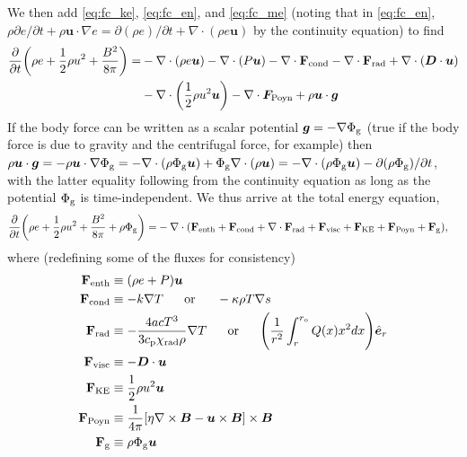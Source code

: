 \documentclass[12pt]{article} %
\newcommand{\pderiv}[2]{\frac{\partial#1}{\partial#2}}
\newcommand{\five}{\ \ \ \ \ }
\newcommand{\e}{\hat{\bm{e}}}
\newcommand{\curl}{\nabla\times}
\newcommand{\Div}{\nabla\cdot}
\newcommand{\phig}{\Phi_{\rm{g}}}
\newcommand{\ro}{r_{\rm{o}}}
\begin{document}
	We then add \eqref{eq:fc_ke}, \eqref{eq:fc_en}, and \eqref{eq:fc_me} (noting that in \eqref{eq:fc_en}, $\rho\partial e/\partial t + \rho\bm{u}\cdot\nabla e = \partial(\rho e)/\partial t + \Div(\rho e\bm{u})$ by the continuity equation) to find
	\begin{align*}
	\pderiv{}{t}\bigg{(}\rho e + \frac{1}{2}\rho u^2 + \frac{B^2}{8\pi}\bigg{)} = &-\Div(\rho e\bm{u}) - \Div(P\bm{u})  - \nabla\cdot\mathbf{F}_{\rm{cond}} -\nabla\cdot\mathbf{F}_{\rm{rad}}  + \Div(\bm{D}\cdot\bm{u}) \\
	&- \Div\bigg{(}\frac{1}{2}\rho u^2\bm{u}\bigg{)} -\Div\bm{F}_{\rm{Poyn}} + \rho\bm{u}\cdot\bm{g}
	\end{align*}
	If the body force can be written as a scalar potential $\bm{g}=-\nabla\phig$ (true if the body force is due to gravity and the centrifugal force, for example) then $\rho\bm{u}\cdot\bm{g} = -\rho\bm{u}\cdot\nabla \phig = -\Div(\rho\phig\bm{u}) + \phig\Div(\rho\bm{u}) = -\Div(\rho\phig\bm{u}) - \partial(\rho\phig)/\partial t$, with the latter equality following from the continuity equation as long as the potential $\phig$ is time-independent. We thus arrive at the total energy equation, 
	\begin{align}
	\pderiv{}{t}\bigg{(}\rho e + \frac{1}{2}\rho u^2 + \frac{B^2}{8\pi} + \rho\phig\bigg{)} = &-\Div(\mathbf{F}_{\rm{enth}} + \mathbf{F}_{\rm{cond}} + \nabla\cdot\mathbf{F}_{\rm{rad}}  + \mathbf{F}_{\rm{visc}} +  \mathbf{F}_{\rm{KE}} + \mathbf{F}_{\rm{Poyn}} + \mathbf{F}_{\rm{g}}),
	\end{align}
	where (redefining some of the fluxes for consistency)
	\begin{align}
	\mathbf{F}_{\rm{enth}} &\equiv (\rho e + P)\bm{u}\\	
	\mathbf{F}_{\rm{cond}} &\equiv -k\nabla T\five\text{or}\five -\kappa\rho T \nabla s\\
	\mathbf{F}_{\rm{rad}} &\equiv - \frac{4acT^3}{3c_{\rm{p}}\chi_{\rm{rad}}\rho}\nabla T\five\text{or}\five\Bigg{(}\frac{1}{r^2}\int_r^{{\ro}}Q(x)x^2dx\Bigg{)}\e_r\\
	\mathbf{F}_{\rm{visc}}  &\equiv -\bm{D}\cdot\bm{u}\\
	\mathbf{F}_{\rm{KE}} &\equiv \frac{1}{2}\rho u^2\bm{u}\\
	\mathbf{F}_{\rm{Poyn}} &\equiv \frac{1}{4\pi}[\eta\curl\bm{B} - \bm{u}\times\bm{B}]\times\bm{B}\\
	\mathbf{F}_{\rm{g}} &\equiv \rho\phig\bm{u}
	\end{align}
\end{document}
